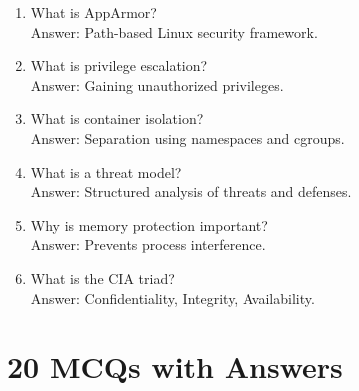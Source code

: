 \begin{enumerate}
\item What is AppArmor?\\
Answer: Path-based Linux security framework.

\item What is privilege escalation?\\
Answer: Gaining unauthorized privileges.

\item What is container isolation?\\
Answer: Separation using namespaces and cgroups.

\item What is a threat model?\\
Answer: Structured analysis of threats and defenses.

\item Why is memory protection important?\\
Answer: Prevents process interference.

\item What is the CIA triad?\\
Answer: Confidentiality, Integrity, Availability.
\end{enumerate}

\section{20 MCQs with Answers}

